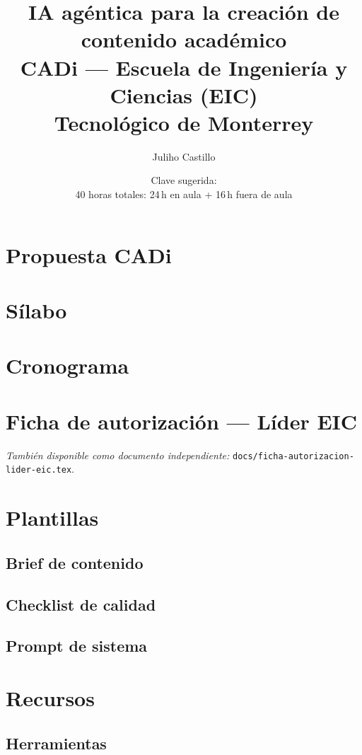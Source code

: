 \documentclass[11pt,a4paper]{report}
\title{IA agéntica para la creación de contenido académico\\
\large CADi --- Escuela de Ingeniería y Ciencias (EIC)\\
Tecnológico de Monterrey}
\author{Juliho Castillo}
\date{Clave sugerida: \clave\\
40 horas totales: 24\,h en aula + 16\,h fuera de aula}
\begin{document}
\maketitle
\tableofcontents
\clearpage

\chapter{Propuesta CADi}


\chapter{Sílabo}


\chapter{Cronograma}


\chapter{Ficha de autorización --- Líder EIC}
\noindent\textit{También disponible como documento independiente:}
\texttt{docs/ficha-autorizacion-lider-eic.tex}.


\chapter{Plantillas}
\section{Brief de contenido}

\section{Checklist de calidad}

\section{Prompt de sistema}


\chapter{Recursos}
\section{Herramientas}

\end{document}
